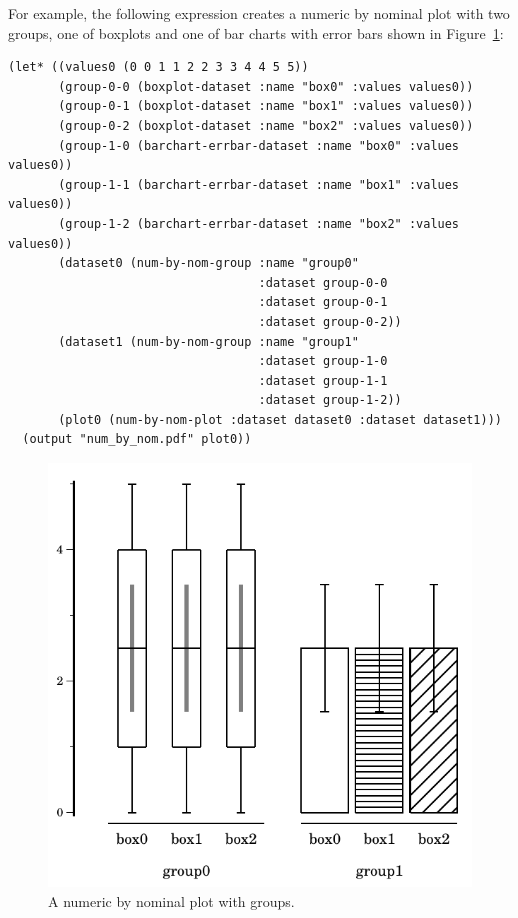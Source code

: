 \documentclass{article}
\begin{document}
For example, the following expression creates a numeric by nominal
plot with two groups, one of boxplots and one of bar charts with error
bars shown in Figure~\ref{fig:num_by_nom}:
\begin{verbatim}
(let* ((values0 (0 0 1 1 2 2 3 3 4 4 5 5))
       (group-0-0 (boxplot-dataset :name "box0" :values values0))
       (group-0-1 (boxplot-dataset :name "box1" :values values0))
       (group-0-2 (boxplot-dataset :name "box2" :values values0))
       (group-1-0 (barchart-errbar-dataset :name "box0" :values values0))
       (group-1-1 (barchart-errbar-dataset :name "box1" :values values0))
       (group-1-2 (barchart-errbar-dataset :name "box2" :values values0))
       (dataset0 (num-by-nom-group :name "group0"
                                   :dataset group-0-0
                                   :dataset group-0-1
                                   :dataset group-0-2))
       (dataset1 (num-by-nom-group :name "group1"
                                   :dataset group-1-0
                                   :dataset group-1-1
                                   :dataset group-1-2))
       (plot0 (num-by-nom-plot :dataset dataset0 :dataset dataset1)))
  (output "num_by_nom.pdf" plot0))
\end{verbatim}

\begin{figure}[t]
\begin{center}
\includegraphics{num_by_nom}
\caption{\label{fig:num_by_nom}A numeric by nominal plot with groups.}
\end{center}
\end{figure}
\end{document}
